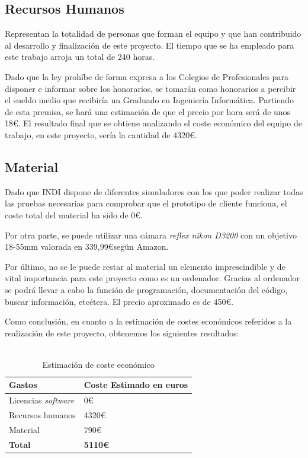 \subsection{Recursos Humanos}
Representan la totalidad de personas que forman el equipo y que han contribuido al desarrollo y finalización de este proyecto. El tiempo que se ha empleado para este trabajo arroja un total de 240 horas.

Dado que la ley prohíbe de forma expresa a los Colegios de Profesionales para disponer e informar sobre los honorarios, se tomarán como honorarios a percibir el sueldo medio que recibiría un Graduado en Ingeniería Informática. Partiendo de esta premisa, se hará una estimación de que el precio por hora será de unos 18\euro. El resultado final que se obtiene analizando el coste económico del equipo de trabajo, en este proyecto, sería la cantidad de 4320\euro.

\subsection{Material}
Dado que INDI dispone de diferentes simuladores con los que poder realizar todas las pruebas necesarias para comprobar que el prototipo de cliente funciona, el coste total del material ha sido de 0\euro.

Por otra parte, se puede utilizar una cámara \textit{reflex nikon D3200} con un objetivo 18-55mm valorada en 339,99\euro según Amazon.\cite{NikonAmazon}

Por último, no se le puede restar al material un elemento imprescindible y de vital importancia para este proyecto como es un ordenador. Gracias al ordenador se podrá llevar a cabo la función de programación, documentación del código, buscar información, etcétera. El precio aproximado es de 450\euro.

Como conclusión, en cuanto a la estimación de costes económicos referidos a la realización de este proyecto, obtenemos los siguientes resultados:
\\ \\
\begin{table}[h]
\centering
\label{table:costeEstimado}
\begin{tabular}{ll}
\hline
{\bf Gastos}                   & {\bf Coste Estimado en euros} \\ \hline
Licencias \textit{software}   & 0\euro                             \\
Recursos humanos              & 4320\euro                          \\
Material                      & 790\euro                           \\
{\bf Total}                   & {\bf 5110\euro}                          \\ \hline
\end{tabular}
\caption{Estimación de coste económico}
\end{table}


